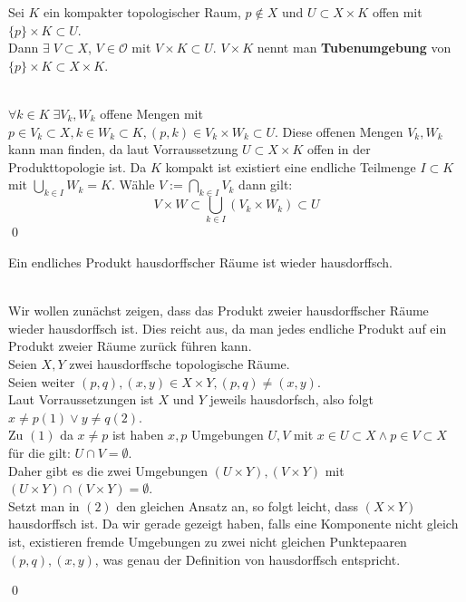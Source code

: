 	\begin{Lemma}[Tubenlemma]
		Sei \(K \) ein kompakter topologischer Raum,  \(p \notin X \) und \( U \subset X \times K \) offen mit \( \{p\} \times K \subset U \). \\
		Dann \( \exists \; V \subset X \), \( V \in \mathcal{O} \) mit \( V \times K \subset U \). \( V \times K \) nennt man { \bf Tubenumgebung } von 
		\( \{p\} \times K \subset X \times K \).
	\end{Lemma} 
		
		\\
		\( \forall k \in K \; \exists V_{k}, W_{k}\) offene Mengen mit \( p \in V_{k} \subset X, k \in W_{k} \subset K, (p,k) \in  V_{k} \times W_{k} \subset U\).
		Diese offenen Mengen \(V_{k}, W_{k}\) kann man finden, da laut Vorraussetzung \(U  \subset X \times K \) offen in der Produkttopologie ist.
		Da \(K \) kompakt ist existiert eine endliche Teilmenge
		\( I \subset K \) mit \( \bigcup_{ k \in I } W_{k} = K \). Wähle \(V := \bigcap_{ k \in I } V_{k} \) dann gilt:
		\[ V \times W \subset \bigcup_{k \in I} (V_{k} \times W_{k}) \subset U \]
		\qed
	
	\begin{Satz}
		Ein endliches Produkt hausdorffscher Räume ist wieder hausdorffsch.
		
	\end{Satz}
		\\
		Wir wollen zunächst zeigen, dass das Produkt zweier hausdorffscher Räume wieder hausdorffsch ist. Dies reicht aus, da man jedes endliche Produkt 
		auf ein Produkt zweier Räume zurück führen kann. \\
		Seien \(X, Y\) zwei hausdorffsche topologische Räume.\\
		Seien weiter \( (p,q), (x,y) \in X \times Y, (p,q) \ne (x,y) \). \\
		Laut Vorraussetzungen ist \(X\) und \(Y\) jeweils hausdorfsch, also folgt \(x \ne p (1) \lor y \ne q (2)\).\\
		Zu \((1) \) da \(x \ne p \) ist haben \(x, p \) Umgebungen \(U, V \) mit \( x \in U \subset X \land p \in V \subset X \) für die gilt: \( U \cap V = \emptyset \).\\ Daher gibt es die
		zwei Umgebungen \( (U \times Y), (V \times Y) \) mit \( (U \times Y) \cap (V \times Y) = \emptyset \). \\
		Setzt man in \((2) \) den gleichen Ansatz an, so folgt leicht, dass \( (X \times Y) \) hausdorffsch ist. Da wir gerade gezeigt haben, falls eine Komponente nicht gleich ist,
		existieren fremde Umgebungen zu zwei nicht gleichen Punktepaaren\( (p,q), (x,y) \), was genau der Definition von hausdorffsch entspricht.
	
		\qed
		
	
		
		
		
		